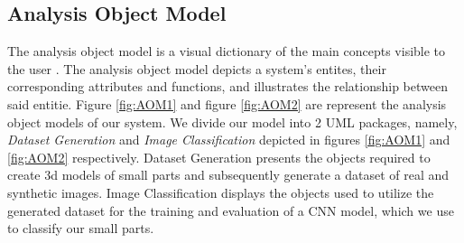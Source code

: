 \newpage
\begin{usecase}





\end{usecase}

\newpage
\subsection{Analysis Object Model}\label{analysis_object_model}
The analysis object model is a visual dictionary of the main concepts visible to the user \cite{bruegge2004object}. The analysis object model depicts a system's entites, their corresponding attributes and functions, and illustrates the relationship between said entitie. Figure \ref{fig:AOM1} and figure \ref{fig:AOM2} are represent the analysis object models of our system. We divide our model into 2 UML packages, namely, \textit{Dataset Generation} and \textit{Image Classification} depicted in figures \ref{fig:AOM1} and \ref{fig:AOM2} respectively. Dataset Generation presents the objects required to create 3d models of small parts and subsequently generate a dataset of real and synthetic images. Image Classification displays the objects used to utilize the generated dataset for the training and evaluation of a CNN model, which we use to classify our small parts.

